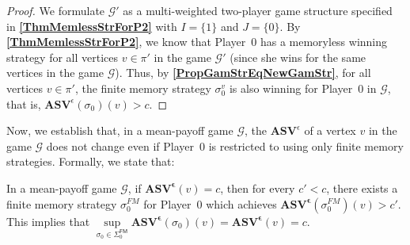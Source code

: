 \begin{proof}
We formulate $\mathcal{G'}$ as a multi-weighted two-player game structure specified in \textbf{\cref{ThmMemlessStrForP2}} with $I = \{1\}$ and $J = \{0\}$. By \textbf{\cref{ThmMemlessStrForP2}}, we know that Player~0 has a memoryless winning strategy for all vertices $v \in \pi'$ in the game $\mathcal{G'}$ (since she wins for the same vertices in the game $\mathcal{G}$).
Thus, by \textbf{\cref{PropGamStrEqNewGamStr}}, for all vertices $v \in \pi'$, the finite memory strategy $\sigma_0^v$ is also winning for Player~0 in $\mathcal{G}$, that is, $\mathbf{ASV}^{\epsilon}(\sigma_0)(v) > c$.
\end{proof}

Now, we establish that, in a mean-payoff game $\mathcal{G}$, the $\mathbf{ASV}^{\epsilon}$ of a vertex $v$ in the game $\mathcal{G}$ does not change even if Player~0 is restricted to using only finite memory strategies. Formally, we state that:

\begin{corollary}
\label{CorASVEqASVFin}
In a mean-payoff game $\mathcal{G}$, if $\mathbf{ASV^{\epsilon}}(v) = c$, then for every $c' < c$, there exists a finite memory strategy $\sigma_0^{FM}$ for Player~0 which achieves $\mathbf{ASV^{\epsilon}}(\sigma_0^{FM})(v) > c'$. This implies that $\sup\limits_{\sigma_0 \in \Sigma_0^{\mathsf{FM}}} \mathbf{ASV^{\epsilon}}(\sigma_0)(v) = \mathbf{ASV^{\epsilon}}(v) = c$.
\end{corollary}